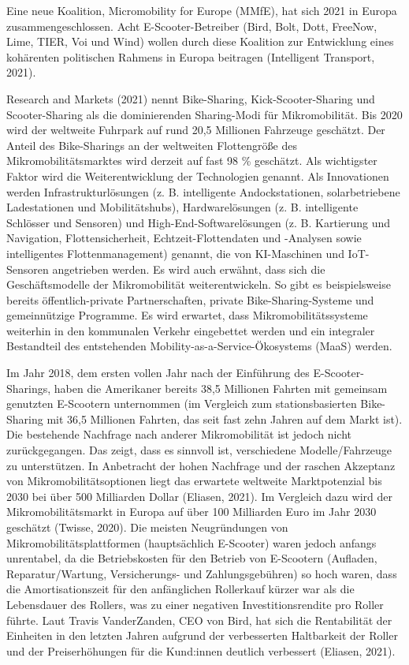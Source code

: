 \documentclass[
]{book}
\begin{document}
Eine neue Koalition, Micromobility for Europe (MMfE), hat sich 2021 in Europa zusammengeschlossen. Acht E-Scooter-Betreiber (Bird, Bolt, Dott, FreeNow, Lime, TIER, Voi und Wind) wollen durch diese Koalition zur Entwicklung eines kohärenten politischen Rahmens in Europa beitragen (Intelligent Transport, 2021).

Research and Markets (2021) nennt Bike-Sharing, Kick-Scooter-Sharing und Scooter-Sharing als die dominierenden Sharing-Modi für Mikromobilität. Bis 2020 wird der weltweite Fuhrpark auf rund 20,5 Millionen Fahrzeuge geschätzt. Der Anteil des Bike-Sharings an der weltweiten Flottengröße des Mikromobilitätsmarktes wird derzeit auf fast 98 \% geschätzt. Als wichtigster Faktor wird die Weiterentwicklung der Technologien genannt. Als Innovationen werden Infrastrukturlösungen (z. B. intelligente Andockstationen, solarbetriebene Ladestationen und Mobilitätshubs), Hardwarelösungen (z. B. intelligente Schlösser und Sensoren) und High-End-Softwarelösungen (z. B. Kartierung und Navigation, Flottensicherheit, Echtzeit-Flottendaten und -Analysen sowie intelligentes Flottenmanagement) genannt, die von KI-Maschinen und IoT-Sensoren angetrieben werden. Es wird auch erwähnt, dass sich die Geschäftsmodelle der Mikromobilität weiterentwickeln. So gibt es beispielsweise bereits öffentlich-private Partnerschaften, private Bike-Sharing-Systeme und gemeinnützige Programme. Es wird erwartet, dass Mikromobilitätssysteme weiterhin in den kommunalen Verkehr eingebettet werden und ein integraler Bestandteil des entstehenden Mobility-as-a-Service-Ökosystems (MaaS) werden.

Im Jahr 2018, dem ersten vollen Jahr nach der Einführung des E-Scooter-Sharings, haben die Amerikaner bereits 38,5 Millionen Fahrten mit gemeinsam genutzten E-Scootern unternommen (im Vergleich zum stationsbasierten Bike-Sharing mit 36,5 Millionen Fahrten, das seit fast zehn Jahren auf dem Markt ist). Die bestehende Nachfrage nach anderer Mikromobilität ist jedoch nicht zurückgegangen. Das zeigt, dass es sinnvoll ist, verschiedene Modelle/Fahrzeuge zu unterstützen. In Anbetracht der hohen Nachfrage und der raschen Akzeptanz von Mikromobilitätsoptionen liegt das erwartete weltweite Marktpotenzial bis 2030 bei über 500 Milliarden Dollar (Eliasen, 2021). Im Vergleich dazu wird der Mikromobilitätsmarkt in Europa auf über 100 Milliarden Euro im Jahr 2030 geschätzt (Twisse, 2020). Die meisten Neugründungen von Mikromobilitätsplattformen (hauptsächlich E-Scooter) waren jedoch anfangs unrentabel, da die Betriebskosten für den Betrieb von E-Scootern (Aufladen, Reparatur/Wartung, Versicherungs- und Zahlungsgebühren) so hoch waren, dass die Amortisationszeit für den anfänglichen Rollerkauf kürzer war als die Lebensdauer des Rollers, was zu einer negativen Investitionsrendite pro Roller führte. Laut Travis VanderZanden, CEO von Bird, hat sich die Rentabilität der Einheiten in den letzten Jahren aufgrund der verbesserten Haltbarkeit der Roller und der Preiserhöhungen für die Kund:innen deutlich verbessert (Eliasen, 2021).
\end{document}
